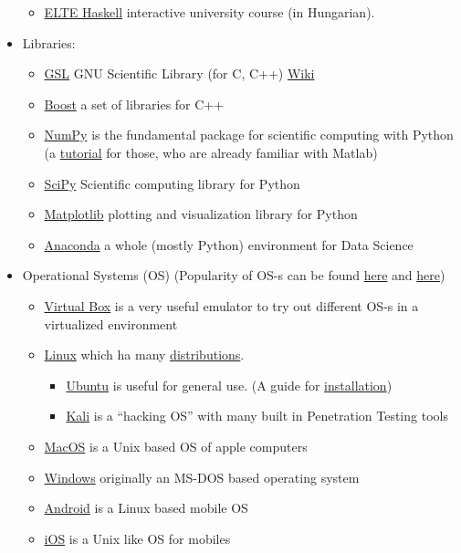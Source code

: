 \documentclass{article}
\begin{document}
\begin{itemize}
\begin{itemize}
        \item \href{http://lambda.inf.elte.hu}{ELTE Haskell} interactive university course (in Hungarian).
    \end{itemize}
    
    \item Libraries:
    \begin{itemize}
        \item \href{https://www.gnu.org/software/gsl/}{GSL} GNU Scientific Library (for C, C++) \href{https://en.wikipedia.org/wiki/GNU_Scientific_Library}{Wiki}
        \item \href{https://www.boost.org/}{Boost} a set of libraries for C++
        \item \href{https://numpy.org/}{NumPy} is the fundamental package for scientific computing with Python (a \href{https://docs.scipy.org/doc/numpy/user/numpy-for-matlab-users.html}{tutorial} for those, who are already familiar with Matlab)
        \item \href{https://www.scipy.org/}{SciPy} Scientific computing library for Python
        \item \href{https://matplotlib.org/}{Matplotlib} plotting and visualization library for Python
        \item \href{https://www.anaconda.com/products/individual}{Anaconda} a whole (mostly Python) environment for Data Science
    \end{itemize}
    
    \item Operational Systems (OS) (Popularity of OS-s can be found \href{https://www.w3schools.com/browsers/browsers_os.asp}{here} and \href{https://gs.statcounter.com/os-market-share}{here})
    \begin{itemize}
        \item \href{https://www.virtualbox.org/}{Virtual Box} is a very useful emulator to try out different OS-s in a virtualized environment
        
        \item \href{https://en.wikipedia.org/wiki/Linux}{Linux} which ha many \href{https://en.wikipedia.org/wiki/Linux_distribution}{distributions}.
        \begin{itemize}
            \item \href{https://ubuntu.com/}{Ubuntu} is useful for general use. (A guide for \href{https://itsfoss.com/install-ubuntu/}{installation})
            \item \href{https://www.kali.org/}{Kali} is a ``hacking OS'' with many built in Penetration Testing tools
        \end{itemize}
        \item \href{https://www.apple.com/macos/}{MacOS} is a Unix based OS of apple computers
        \item \href{https://www.microsoft.com/en-us/windows/}{Windows} originally an MS-DOS based operating system
        \item \href{https://www.android.com/}{Android} is a Linux based mobile OS
        \item \href{https://www.apple.com/ios/}{iOS} is a Unix like OS for mobiles
    \end{itemize}
    

\end{itemize}
\end{document}
